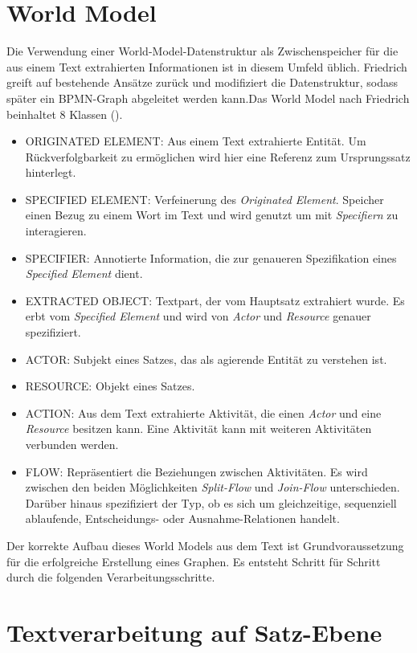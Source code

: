 \section{World Model}
Die Verwendung einer World-Model-Datenstruktur als Zwischenspeicher für die aus einem Text extrahierten Informationen ist in diesem Umfeld üblich. Friedrich greift auf bestehende Ansätze zurück und modifiziert die Datenstruktur, sodass später ein \ac{BPMN}-Graph abgeleitet werden kann.Das World Model nach Friedrich beinhaltet 8 Klassen (\cite[vgl.][46]{FRIEDRICH2}). 
\par
\begin{itemize} 
\item ORIGINATED ELEMENT: Aus einem Text extrahierte Entität. Um Rück\-ver\-folg\-bar\-keit zu ermöglichen wird hier eine Referenz zum Ursprungssatz hinterlegt.
\item SPECIFIED ELEMENT: Verfeinerung des \textit{Originated Element}. Speicher einen Bezug zu einem Wort im Text und wird genutzt um mit \textit{Specifiern} zu interagieren.
\item SPECIFIER: Annotierte Information, die zur genaueren Spezifikation eines \textit{Specified Element} dient.
\item EXTRACTED OBJECT: Textpart, der vom Hauptsatz extrahiert wurde. Es erbt vom \textit{Specified Element} und wird  von \textit{Actor} und \textit{Resource} genauer spezifiziert.
\item ACTOR: Subjekt eines Satzes, das als agierende Entität zu verstehen ist. 
\item RESOURCE: Objekt eines Satzes.
\item ACTION: Aus dem Text extrahierte Aktivität, die einen \textit{Actor} und eine \textit{Resource} besitzen kann. Eine Aktivität kann mit weiteren Aktivitäten verbunden werden.
\item FLOW: Repräsentiert die Beziehungen zwischen Aktivitäten. Es wird zwischen den beiden Möglichkeiten \textit{Split-Flow} und \textit{Join-Flow} unterschieden. Darüber hinaus spezifiziert der Typ, ob es sich um gleichzeitige, sequenziell ablaufende, Entscheidungs- oder Ausnahme-Relationen handelt.
\end{itemize}

Der korrekte Aufbau dieses World Models aus dem Text ist Grundvoraussetzung für die erfolgreiche Erstellung eines Graphen. Es entsteht Schritt für Schritt durch die folgenden Verarbeitungsschritte.

\section{Textverarbeitung auf Satz-Ebene}

